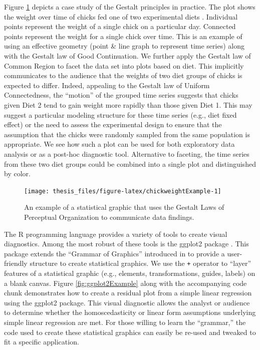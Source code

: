 \documentclass[11pt,]{isuthesis}
\begin{document}
Figure \ref{fig:chickweightExample} depicts a case study of the Gestalt principles in practice.
The plot shows the weight over time of chicks fed one of two experimental diets \citep{crowder1990analysis}.
Individual points represent the weight of a single chick on a particular day.
Connected points represent the weight for a single chick over time.
This is an example of using an effective geometry (point \& line graph to represent time series) along with the Gestalt law of Good Continuation.
We further apply the Gestalt law of Common Region to facet the data set into plots based on diet.
This implicitly communicates to the audience that the weights of two diet groups of chicks is expected to differ.
Indeed, appealing to the Gestalt law of Uniform Connectedness, the ``motion'' of the grouped time series suggests that chicks given Diet 2 tend to gain weight more rapidly than those given Diet 1.
This may suggest a particular modeling structure for these time series (e.g., diet fixed effect) or the need to assess the experimental design to ensure that the assumption that the chicks were randomly sampled from the same population is appropriate.
We see how such a plot can be used for both exploratory data analysis or as a post-hoc diagnostic tool.
Alternative to faceting, the time series from these two diet groups could be combined into a single plot and distinguished by color.

\begin{figure}[!htbp]

{\centering \texttt{[image: thesis\_files/figure-latex/chickweightExample-1]} 

}

\caption{An example of a statistical graphic that uses the Gestalt Laws of Perceptual Organization to communicate data findings.}\label{fig:chickweightExample}
\end{figure}

The R programming language \citep{Rlanguage} provides a variety of tools to create visual diagnostics.
Among the most robust of these tools is the ggplot2 package \citep{ggplot2}.
This package extends the ``Grammar of Graphics'' introduced in \citet{Wilkinson2005} to provide a user-friendly structure to create statistical graphics.
We use the \texttt{+} operator to ``layer'' features of a statistical graphic (e.g., elements, transformations, guides, labels) on a blank canvas.
Figure \ref{fig:ggplot2Example} along with the accompanying code chunk demonstrates how to create a residual plot from a simple linear regression using the ggplot2 package.
This visual diagnostic allows the analyst or audience to determine whether the homoscedasticity or linear form assumptions underlying simple linear regression are met.
For those willing to learn the ``grammar,'' the code used to create these statistical graphics can easily be re-used and tweaked to fit a specific application.
\end{document}
